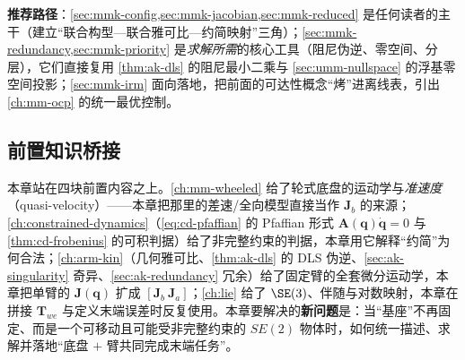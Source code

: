 \begin{center}
\small
{}
\end{center}

\noindent\textbf{推荐路径}：\cref{sec:mmk-config,sec:mmk-jacobian,sec:mmk-reduced} 是任何读者的主干（建立“联合构型—联合雅可比—约简映射”三角）；\cref{sec:mmk-redundancy,sec:mmk-priority} 是\emph{求解所需}的核心工具（阻尼伪逆、零空间、分层），它们直接复用 \cref{thm:ak-dls} 的阻尼最小二乘与 \cref{sec:umm-nullspace} 的浮基零空间投影；\cref{sec:mmk-irm} 面向落地，把前面的可达性概念“烤”进离线表，引出 \cref{ch:mm-ocp} 的统一最优控制。

\subsection*{前置知识桥接}
本章站在四块前置内容之上。\cref{ch:mm-wheeled} 给了轮式底盘的运动学与\emph{准速度}（quasi-velocity）——本章把那里的差速/全向模型直接当作 $\mathbf{J}_b$ 的来源；\cref{ch:constrained-dynamics}（\cref{eq:cd-pfaffian} 的 Pfaffian 形式 $\mathbf{A}(\mathbf{q})\dot{\mathbf{q}}=0$ 与 \cref{thm:cd-frobenius} 的可积判据）给了非完整约束的判据，本章用它解释“约简”为何合法；\cref{ch:arm-kin}（几何雅可比、\cref{thm:ak-dls} 的 DLS 伪逆、\cref{sec:ak-singularity} 奇异、\cref{sec:ak-redundancy} 冗余）给了固定臂的全套微分运动学，本章把单臂的 $\mathbf{J}(\mathbf{q})$ 扩成 $[\mathbf{J}_b\ \mathbf{J}_a]$；\cref{ch:lie} 给了 $\SE(3)$、伴随与对数映射，本章在拼接 $\mathbf{T}_{we}$ 与定义末端误差时反复使用。本章要解决的\textbf{新问题}是：当“基座”不再固定、而是一个可移动且可能受非完整约束的 $SE(2)$ 物体时，如何统一描述、求解并落地“底盘 $+$ 臂共同完成末端任务”。

